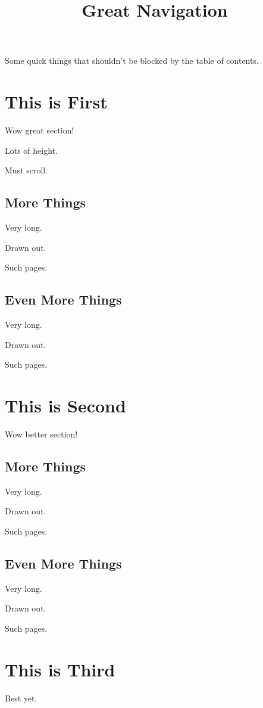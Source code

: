 
\title{Great Navigation}
\date{}



Some quick things that shouldn't be blocked by the table of contents.

\tableofcontents

\section{This is First}

Wow great section!

Lots of height.

Must scroll.

\subsection{More Things}

Very long.

Drawn out.

Such pages.

\subsection{Even More Things}
\label{sec:onepointtwo}

Very long.

Drawn out.

Such pages.

\section{This is Second}

Wow better section!

\subsection{More Things}

Very long.

Drawn out.

Such pages.

\subsection{Even More Things}

Very long.

Drawn out.

Such pages.

\section{This is Third}
\label{sec:third}

Best yet.



